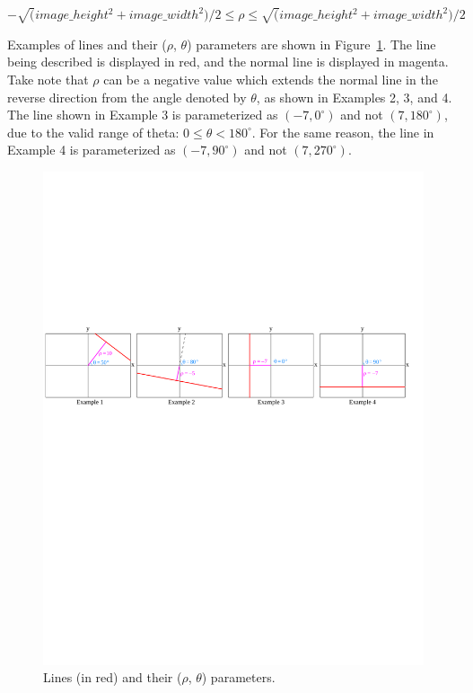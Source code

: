 \documentclass[epsfig,10pt,fullpage]{article}
\begin{document}
$-\sqrt(image\_height^2+image\_width^2)/2 \leq \rho \leq \sqrt(image\_height^2+image\_width^2)/2$

Examples of lines and their ($\rho$, $\theta$) parameters are shown in Figure~\ref{fig:hesse_normal_examples}.
The line being described is displayed in red, and the normal line is displayed in magenta. 
Take note that $\rho$ can be a negative value which extends the normal line in the reverse direction from the angle
denoted by $\theta$, as shown in Examples 2, 3, and 4. The line shown in Example 3 is
parameterized as $(-7, 0^\circ)$ and not $(7, 180^\circ)$, due to the valid range of theta: $0 \leq \theta < 180^\circ$.
For the same reason, the line in Example 4 is parameterized as $(-7, 90^\circ)$ and not $(7, 270^\circ)$.

\begin{figure}[H]
   \begin{center}
       \includegraphics[scale = 0.78]{figures/fig_hesse_normal_examples}
   \end{center}
   \caption{Lines (in red) and their ($\rho$, $\theta$) parameters.}
	\label{fig:hesse_normal_examples}
\end{figure}
\end{document}
